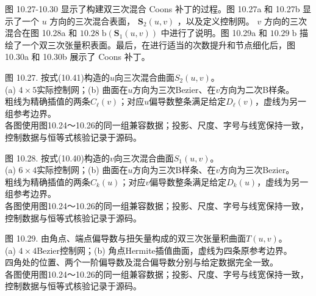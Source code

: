 \documentclass[../main.tex]{subfiles}
\begin{document}
图 10.27-10.30 显示了构建双三次混合 Coons 补丁的过程。图 10.27a 和 10.27b 显示了一个 \(u\) 方向的三次混合表面， \({\mathbf{S}}_{2}\left( {u,v}\right)\) ，以及定义控制网。 \(v\) 方向的三次混合在图 10.28a 和 \({10.28}\mathrm{\;b}\left( {{\mathbf{S}}_{1}\left( {u,v}\right) }\right)\) 中进行了说明。图 10.29a 和 \({10.29}\mathrm{\;b}\) 描绘了一个双三次张量积表面。最后，在进行适当的次数提升和节点细化后，图 10.30a 和 10.30b 展示了 Coons 补丁。

\begin{center}
\begin{minipage}{37cm}
\vspace*{.6\baselineskip}
\centering
{}
\par\smallskip
图 10.27. 按式(10.41)构造的$u$向三次混合曲面$S_2(u,v)$。\\
(a) $4\times5$实际控制网；(b) 曲面在$u$方向为三次Bezier、在$v$方向为二次B样条。\\
粗线为精确插值的两条$C_\ell(v)$；对应$u$偏导数整条满足给定$D_\ell(v)$，虚线为另一组参考边界。\\
各图使用图10.24～10.26的同一组兼容数据；投影、尺度、字号与线宽保持一致，控制数据与恒等式核验记录于源码。
\end{minipage}
\end{center}

\begin{center}
\begin{minipage}{37cm}
\vspace*{.6\baselineskip}
\centering
{}
\par\smallskip
图 10.28. 按式(10.40)构造的$v$向三次混合曲面$S_1(u,v)$。\\
(a) $6\times4$实际控制网；(b) 曲面在$u$方向为三次B样条、在$v$方向为三次Bezier。\\
粗线为精确插值的两条$C_k(u)$；对应$v$偏导数整条满足给定$D_k(u)$，虚线为另一组参考边界。\\
各图使用图10.24～10.26的同一组兼容数据；投影、尺度、字号与线宽保持一致，控制数据与恒等式核验记录于源码。
\end{minipage}
\end{center}

\begin{center}
\begin{minipage}{37cm}
\vspace*{.6\baselineskip}
\centering
{}
\par\smallskip
图 10.29. 由角点、端点偏导数与扭矢量构成的双三次张量积曲面$T(u,v)$。\\
(a) $4\times4$Bezier控制网；(b) 角点Hermite插值曲面，虚线为四条原参考边界。\\
四角处的位置、两个一阶偏导数及混合偏导数分别与给定数据完全一致。\\
各图使用图10.24～10.26的同一组兼容数据；投影、尺度、字号与线宽保持一致，控制数据与恒等式核验记录于源码。
\end{minipage}
\end{center}
\end{document}
